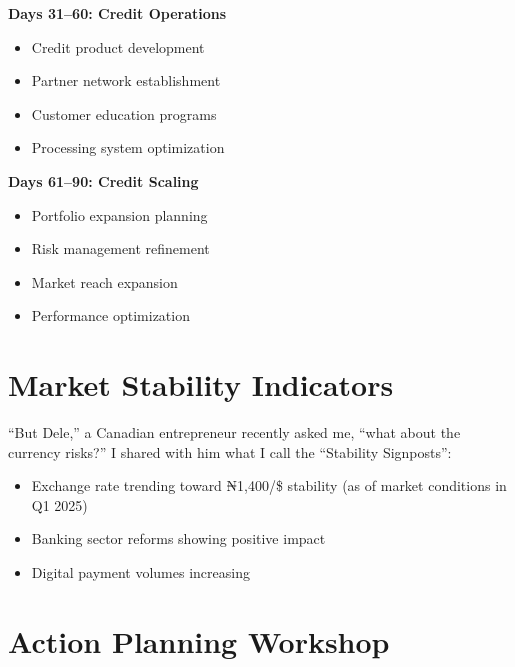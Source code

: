 \textbf{Days 31--60: Credit Operations}
\begin{itemize}
    \item Credit product development
    \item Partner network establishment
    \item Customer education programs
    \item Processing system optimization
\end{itemize}

\textbf{Days 61--90: Credit Scaling}
\begin{itemize}
    \item Portfolio expansion planning
    \item Risk management refinement
    \item Market reach expansion
    \item Performance optimization
\end{itemize}

\section{Market Stability Indicators}\label{sec:market-stability}

``But Dele,'' a Canadian entrepreneur recently asked me, ``what about the currency risks?'' I shared with him what I call the ``Stability Signposts'':

\begin{itemize}
    \item Exchange rate trending toward ₦1,400/\$ stability (as of market conditions in Q1 2025)
    \item Banking sector reforms showing positive impact
    \item Digital payment volumes increasing
\end{itemize}

\section{Action Planning Workshop}\label{sec:action-planning}

